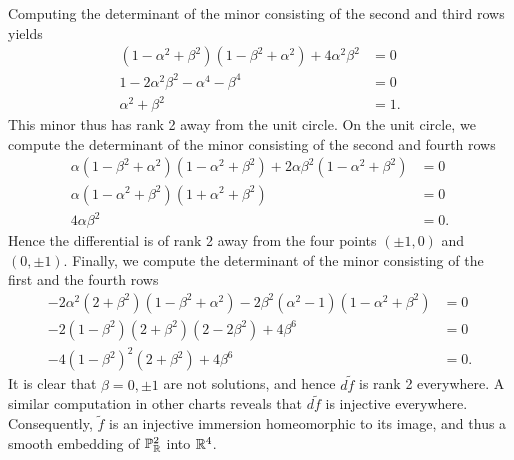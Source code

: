 \documentclass{../mathnotes}
\begin{document}
Computing the determinant of the minor consisting of the second and third rows yields
\begin{align*}
    (1-\alpha^2+\beta^2)(1-\beta^2+\alpha^2)+4\alpha^2\beta^2 &=0\\
    1-2\alpha^2\beta^2-\alpha^4-\beta^4 &= 0\\
    \alpha^2+\beta^2 &= 1.
\end{align*}
This minor thus has rank 2 away from the unit circle. On the unit circle, we compute the determinant
of the minor consisting of the second and fourth rows
\begin{align*}
    \alpha(1-\beta^2+\alpha^2)(1-\alpha^2+\beta^2)+2\alpha\beta^2(1-\alpha^2+\beta^2) &= 0\\
    \alpha(1-\alpha^2+\beta^2)(1+\alpha^2+\beta^2) &= 0\\
    4\alpha\beta^2 &= 0.
\end{align*}
Hence the differential is of rank 2 away from the four points $(\pm1,0)$ and $(0,\pm 1)$. Finally,
we compute the determinant of the minor consisting of the first and the fourth rows
\begin{align*}
    -2\alpha^2(2+\beta^2)(1-\beta^2+\alpha^2)-2\beta^2(\alpha^2-1)(1-\alpha^2+\beta^2) &= 0\\
    -2(1-\beta^2)(2+\beta^2)(2-2\beta^2)+4\beta^6 &= 0\\
    -4(1-\beta^2)^2(2+\beta^2)+4\beta^6 &= 0.
\end{align*}
It is clear that $\beta=0,\pm 1$ are not solutions, and hence $d\tilde f$ is rank 2 everywhere.
A similar computation in other charts reveals that $d\tilde f$ is injective everywhere. Consequently,
$\tilde f$ is an injective immersion homeomorphic to its image, and thus a smooth embedding of $\mathbb{P}_{\mathbb{R}}^2$
into $\mathbb{R}^4$.
\end{document}
